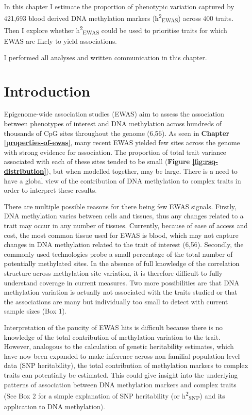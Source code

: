 \documentclass[11pt,oneside]{bristolthesis}
\begin{document}
In this chapter I estimate the proportion of phenotypic variation captured by 421,693 blood derived DNA methylation markers (h\textsuperscript{2}\textsubscript{EWAS}) across 400 traits. Then I explore whether h\textsuperscript{2}\textsubscript{EWAS} could be used to prioritise traits for which EWAS are likely to yield associations.

I performed all analyses and written communication in this chapter.

\hypertarget{introduction-05}{%
\section{Introduction}\label{introduction-05}}

Epigenome-wide association studies (EWAS) aim to assess the association between phenotypes of interest and DNA methylation across hundreds of thousands of CpG sites throughout the genome (6,56). As seen in \textbf{Chapter \ref{properties-of-ewas}}, many recent EWAS yielded few sites across the genome with strong evidence for association. The proportion of total trait variance associated with each of these sites tended to be small (\textbf{Figure \ref{fig:rsq-distribution}}), but when modelled together, may be large. There is a need to have a global view of the contribution of DNA methylation to complex traits in order to interpret these results.

There are multiple possible reasons for there being few EWAS signals. Firstly, DNA methylation varies between cells and tissues, thus any changes related to a trait may occur in any number of tissues. Currently, because of ease of access and cost, the most common tissue used for EWAS is blood, which may not capture changes in DNA methylation related to the trait of interest (6,56). Secondly, the commonly used technologies probe a small percentage of the total number of potentially methylated sites. In the absence of full knowledge of the correlation structure across methylation site variation, it is therefore difficult to fully understand coverage in current measures. Two more possibilities are that DNA methylation variation is actually not associated with the traits studied or that the associations are many but individually too small to detect with current sample sizes (Box 1).

Interpretation of the paucity of EWAS hits is difficult because there is no knowledge of the total contribution of methylation variation to the trait. However, analogous to the calculation of genetic heritability estimates, which have now been expanded to make inference across non-familial population-level data (SNP heritability), the total contribution of methylation markers to complex traits can potentially be estimated. This could give insight into the underlying patterns of association between DNA methylation markers and complex traits (See Box 2 for a simple explanation of SNP heritability (or h\textsuperscript{2}\textsubscript{SNP}) and its application to DNA methylation).
\end{document}

